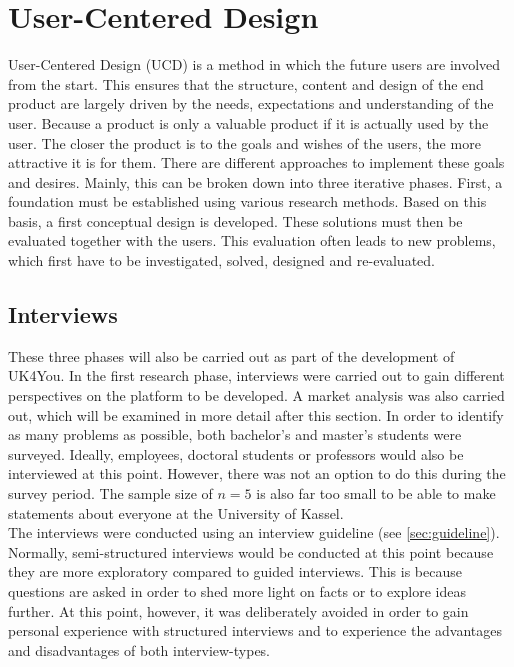 \section{User-Centered Design}
User-Centered Design (UCD) is a method in which the future users are involved from the start\cite{handbook-usability}\cite{key-principles-ucd}.
This ensures that the structure, content and design of the end product are largely driven by the needs, expectations and understanding of the user.
Because a product is only a valuable product if it is actually used by the user.
The closer the product is to the goals and wishes of the users, the more attractive it is for them.
There are different approaches to implement these goals and desires.
Mainly, this can be broken down into three iterative phases.
First, a foundation must be established using various research methods.
Based on this basis, a first conceptual design is developed.
These solutions must then be evaluated together with the users.
This evaluation often leads to new problems, which first have to be investigated, solved, designed and re-evaluated.\\

\subsection{Interviews}
These three phases will also be carried out as part of the development of UK4You.
In the first research phase, interviews were carried out to gain different perspectives on the platform to be developed.
A market analysis was also carried out, which will be examined in more detail after this section.
In order to identify as many problems as possible, both bachelor's and master's students were surveyed.
Ideally, employees, doctoral students or professors would also be interviewed at this point.
However, there was not an option to do this during the survey period.
The sample size of $n=5$ is also far too small to be able to make statements about everyone at the University of Kassel.\\

The interviews were conducted using an interview guideline (see \autoref{sec:guideline}).
Normally, semi-structured interviews would be conducted at this point because they are more exploratory compared to guided interviews.
This is because questions are asked in order to shed more light on facts or to explore ideas further.
At this point, however, it was deliberately avoided in order to gain personal experience with structured interviews and to experience the advantages and disadvantages of both interview-types.\\

